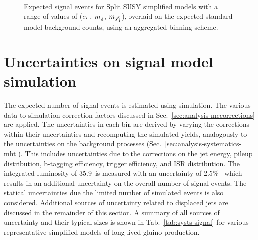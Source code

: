\begin{figure}[!ht]
~~
\\
\caption{Expected signal events for Split SUSY simplified models with a range 
of values of ($c\tau$, $m_{\mathrm{\tilde{g}}}$, $m_{\tilde{\chi}_1^0}$), overlaid on the expected standard 
model background counts, using an aggregated binning scheme.}
\label{fig:T1qqqqLL_MR}
\end{figure}


\section{Uncertainties on signal model simulation}
The expected number of signal events is estimated using simulation. The various 
data-to-simulation correction factors discussed in 
Sec.~\ref{sec:analysis-mccorrections} are applied. The uncertainties in each 
\njnbhtmht bin are derived by varying the corrections within their 
uncertainties and recomputing the simulated yields, analogously to the 
uncertainties on the background processes 
(Sec.~\ref{sec:analysis-systematics-mht}). 
This includes uncertainties due to the corrections on the jet energy, pileup 
distribution, b-tagging efficiency, trigger efficiency, and ISR distribution. 
The integrated luminosity of 35.9~\ifb is measured with an uncertainty of 
2.5\%~\cite{lumi2016} which results in an additional uncertainty on the overall 
number of signal events. The statical uncertainties due the limited number of 
simulated events is also considered. Additional sources of uncertainty related 
to displaced jets are discussed in the remainder of this section. A summary of 
all sources of uncertainty and their typical sizes is shown in 
Tab.~\ref{tab:systs-signal} for various representative simplified models of 
long-lived gluino production.

